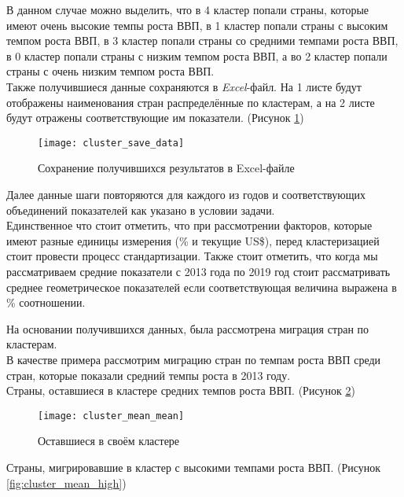 В данном случае можно выделить, что в 4 кластер попали страны, которые имеют очень высокие темпы роста ВВП, в 1 кластер попали страны с высоким темпом роста ВВП, в 3 кластер попали страны со средними темпами роста ВВП, в 0 кластер попали страны с низким темпом роста ВВП, а во 2 кластер попали страны с очень низким темпом роста ВВП.\\

Также получившиеся данные сохраняются в \textit{Excel}-файл. На 1 листе будут отображены наименования стран распределённые по кластерам, а на 2 листе будут отражены соответствующие им показатели. (Рисунок \ref{fig:cluster_save_data})

\begin{figure}[h]
	\centering \texttt{[image: cluster\_save\_data]}
	\caption{Сохранение получившихся результатов в Excel-файле}
	\label{fig:cluster_save_data}
\end{figure}

Далее данные шаги повторяются для каждого из годов и соответствующих объединений показателей как указано в условии задачи.\\

Единственное что стоит отметить, что при рассмотрении факторов, которые имеют разные единицы измерения (\% и текущие US\$), перед кластеризацией стоит провести процесс стандартизации. Также стоит отметить, что когда мы рассматриваем средние показатели с 2013 года по 2019 год стоит рассматривать среднее геометрическое показателей если соответствующая величина выражена в \% соотношении.

\newpage

На основании получившихся данных, была рассмотрена миграция стран по кластерам.\\

В качестве примера рассмотрим миграцию стран по темпам роста ВВП среди стран, которые показали средний темпы роста в 2013 году.\\

Страны, оставшиеся в кластере средних темпов роста ВВП. (Рисунок \ref{fig:cluster_mean_mean})

\begin{figure}[h]
	\centering \texttt{[image: cluster\_mean\_mean]}
	\caption{Оставшиеся в своём кластере}
	\label{fig:cluster_mean_mean}
\end{figure}

\newpage

Страны, мигрировавшие в кластер с высокими темпами роста ВВП. (Рисунок \ref{fig:cluster_mean_high})

